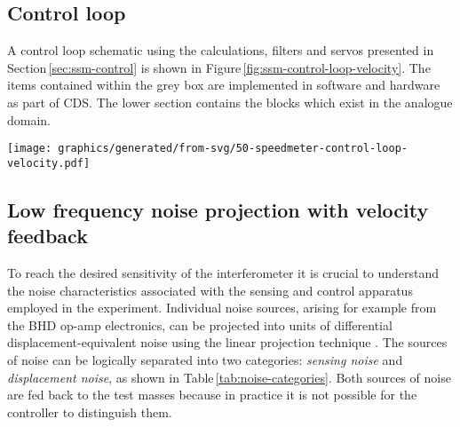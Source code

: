 \subsection{Control loop}

A control loop schematic using the calculations, filters and servos presented in Section\,\ref{sec:ssm-control} is shown in Figure\,\ref{fig:ssm-control-loop-velocity}. The items contained within the grey box are implemented in software and hardware as part of \gls{CDS}. The lower section contains the blocks which exist in the analogue domain.

\begin{sidewaysfigure}
  \texttt{[image: graphics/generated/from-svg/50-speedmeter-control-loop-velocity.pdf]}
  \caption[Modelled \SSMEXPT{} control loop using velocity feedback]{\label{fig:ssm-control-loop-velocity}Simple \SSM{} control loop model. The interferometer plant produces signals representing the probes in the interferometer, and sensing noise is added before the signals are sent to the digital controller, shown in the grey box. Within the controller, the error signal representing \LMINUS{} is fed through a series of filters and sent to the test mass actuators, with the addition of DAC noise. The suspension blocks transform the feedback signals into test mass displacements, and seismic, coating and suspension thermal noise is injected at the input to the interferometer plant. This configuration provides good sensitivity over short periods, but the intrinsic lack of low frequency sensitivity in the main velocity readout leads to drifts causing the arm cavities to lose resonance.}
\end{sidewaysfigure}

\subsection{\label{sec:noise-projection}Low frequency noise projection with velocity feedback}
To reach the desired sensitivity of the interferometer it is crucial to understand the noise characteristics associated with the sensing and control apparatus employed in the experiment. Individual noise sources, arising for example from the \gls{BHD} op-amp electronics, can be projected into units of differential displacement-equivalent noise using the linear projection technique \cite{Smith2006}. The sources of noise can be logically separated into two categories: \emph{sensing noise} and \emph{displacement noise}, as shown in Table\,\ref{tab:noise-categories}. Both sources of noise are fed back to the test masses because in practice it is not possible for the controller to distinguish them.

